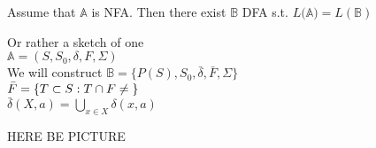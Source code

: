 \thm{}
{
    Assume that $\mathbb{A}$ is NFA. Then there exist $\mathbb{B}$ DFA s.t.
    $L(\mathbb{A)} = L(\mathbb{B})$
}

\begin{myproof}
    Or rather a sketch of one \\
    $\mathbb{A} = (S,S_0,\delta,F,\Sigma)$ \\
    We will construct $\mathbb{B} = \{P(S),S_0,\bar{\delta},\bar{F},\Sigma\}$ \\
    $\bar{F}= \{T \subset S: T \cap F \neq \null\}$\\
    $\bar{\delta}(X,a) = \bigcup_{x\in X}\delta(x,a)$

    HERE BE PICTURE
\end{myproof}
